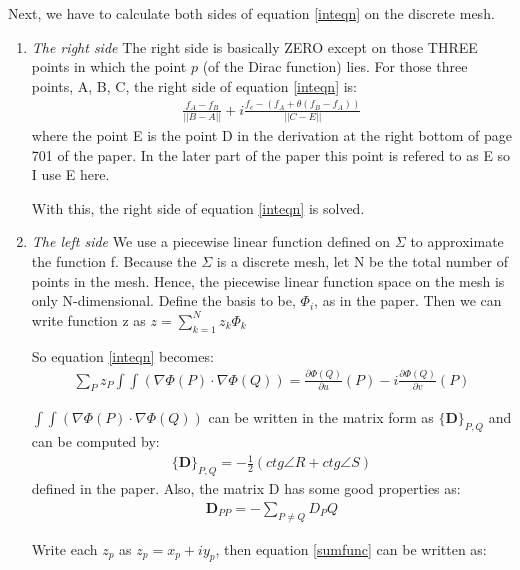 \documentclass[letterpaper]{article}
\begin{document}
  Next, we have to calculate both sides of equation \ref{inteqn} on
  the discrete mesh.

  \begin{enumerate}
  \item \emph{The right side} The right side is basically ZERO
    except on those THREE points in which the point $p$ (of the Dirac
    function) lies. For those three points, A, B, C, the right side of
    equation \ref{inteqn} is:
    \begin{eqnarray}
      \frac{f_A - f_B}{|| B - A ||} + i\frac{f_c-(f_A + \theta(f_B -
        f_A))}{||C - E||} \label{Rinteqn}
    \end{eqnarray}  
    where the point E is the point D in the derivation at the right
    bottom of page 701 of the paper. In the later part of the paper this
    point is refered to as E so I use E here.

    With this, the right side of equation \ref{inteqn} is solved.

  \item \emph{The left side} We use a piecewise linear function
    defined on $\Sigma$ to approximate the function f. Because the
    $\Sigma$ is a discrete mesh, let N be the total number of points
    in the mesh. Hence, the piecewise linear function space on the
    mesh is only N-dimensional. Define the basis to be, $\Phi_i$, as in the
    paper. Then we can write function z as $z = \sum_{k=1}^{N}z_k
    \Phi_k$

    So equation \ref{inteqn} becomes:
    \begin{eqnarray}
      \sum_{P}z_P \int\int (\nabla \Phi(P) \cdot \nabla \Phi(Q)) =
      \frac{\partial \Phi(Q)}{\partial u}(P) - i\frac{\partial
        \Phi(Q)}{\partial v} (P) \label{sumfunc}   
    \end{eqnarray}  
    
    $\int\int (\nabla \Phi(P) \cdot \nabla \Phi(Q))$ can be written in
    the matrix form as $\{ \mathbf{D} \}_{P,Q }$ and can be computed by:
    \begin{eqnarray}
      \{ \mathbf{D} \}_{P,Q } = -\frac{1}{2}(ctg\angle R + ctg\angle S)
      \label{ctg}
    \end{eqnarray}
    defined in the paper. Also, the matrix D has some good properties as:
    \begin{eqnarray}
      \mathbf{D}_{PP} = -\sum_{P \ne Q}D_PQ \label{prop}
    \end{eqnarray}


    Write each $z_p$ as $z_p=x_p + iy_p$, then
    equation \ref{sumfunc} can be written as:


\end{enumerate}
\end{document}
